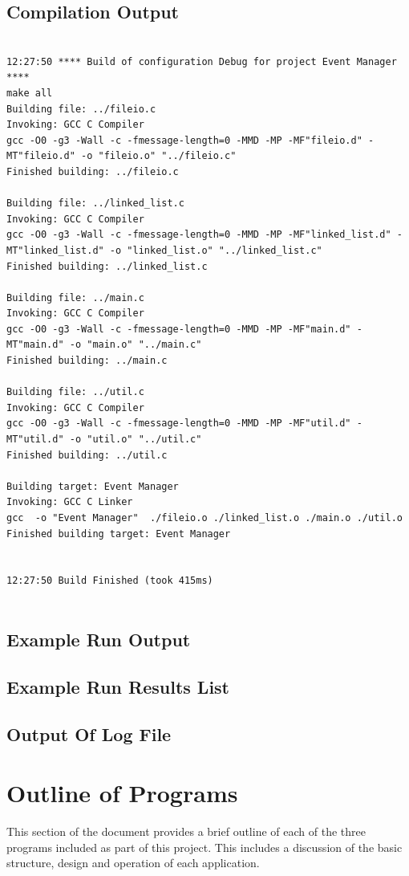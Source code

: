 \documentclass{article}
\begin{document}
\subsection{Compilation Output}
\begin{center}
	\begin{lstlisting}[showstringspaces=false, caption={Build log of the C Event Manager Program}]
	
12:27:50 **** Build of configuration Debug for project Event Manager ****
make all 
Building file: ../fileio.c
Invoking: GCC C Compiler
gcc -O0 -g3 -Wall -c -fmessage-length=0 -MMD -MP -MF"fileio.d" -MT"fileio.d" -o "fileio.o" "../fileio.c"
Finished building: ../fileio.c
 
Building file: ../linked_list.c
Invoking: GCC C Compiler
gcc -O0 -g3 -Wall -c -fmessage-length=0 -MMD -MP -MF"linked_list.d" -MT"linked_list.d" -o "linked_list.o" "../linked_list.c"
Finished building: ../linked_list.c
 
Building file: ../main.c
Invoking: GCC C Compiler
gcc -O0 -g3 -Wall -c -fmessage-length=0 -MMD -MP -MF"main.d" -MT"main.d" -o "main.o" "../main.c"
Finished building: ../main.c
 
Building file: ../util.c
Invoking: GCC C Compiler
gcc -O0 -g3 -Wall -c -fmessage-length=0 -MMD -MP -MF"util.d" -MT"util.d" -o "util.o" "../util.c"
Finished building: ../util.c
 
Building target: Event Manager
Invoking: GCC C Linker
gcc  -o "Event Manager"  ./fileio.o ./linked_list.o ./main.o ./util.o   
Finished building target: Event Manager
 

12:27:50 Build Finished (took 415ms)
		
	\end{lstlisting}
\end{center}
\subsection{Example Run Output}

\subsection{Example Run Results List}

\subsection{Output Of Log File}

\section{Outline of Programs}
This section of the document provides a brief outline of each of the three programs included as part of this project. This includes a discussion of the basic structure, design and operation of each application.
\end{document}
